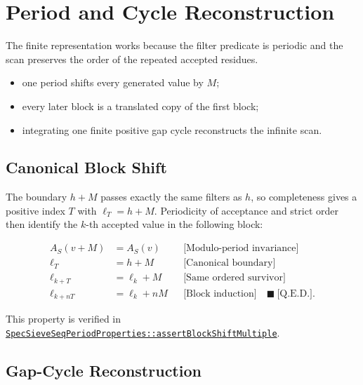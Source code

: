 \section{Period and Cycle Reconstruction}
\label{sec:period-and-cycle-reconstruction}

The finite representation works because the filter predicate is periodic
and the scan preserves the order of the repeated accepted residues.

\begin{itemize}
  \item one period shifts every generated value by $M$;
  \item every later block is a translated copy of the first block;
  \item integrating one finite positive gap cycle reconstructs the
    infinite scan.
\end{itemize}

\subsection{Canonical Block Shift}
\label{sec:canonical-block-shift}

The boundary $h+M$ passes exactly the same filters as $h$, so
completeness gives a positive index $T$ with $\ell_T=h+M$. Periodicity of
acceptance and strict order then identify the $k$-th accepted value in
the following block:

\begin{equation*}
\begin{aligned}
A_S(v+M) &= A_S(v)
  &&\text{[Modulo-period invariance]} \\
\ell_T &= h+M
  &&\text{[Canonical boundary]} \\
\ell_{k+T} &= \ell_k+M
  &&\text{[Same ordered survivor]} \\
\ell_{k+nT} &= \ell_k+nM
  &&\text{[Block induction]}\quad\blacksquare\ \text{[Q.E.D.]}.
\end{aligned}
\end{equation*}

This property is verified in
\href{https://github.com/thiagomata/prime-numbers/blob/master/src/main/scala/v1/chapter6/sieve/seq/spec/properties/SpecSieveSeqPeriodProperties.scala}{\texttt{SpecSieveSeqPeriodProperties::assertBlockShiftMultiple}}.

\subsection{Gap-Cycle Reconstruction}
\label{sec:gap-cycle-reconstruction}

